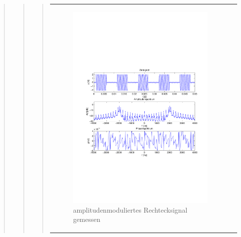 \begin{quote}
\begin{quote}
\begin{quote}
\begin{center}
\begin{tabular}{ll}
\begin{minipage}{0.6\textwidth}
                    \end{minipage}
                    \begin{minipage}{0.6\textwidth}
    
                         \begin{figure}[H]
                            \label{fig:}
                            \includegraphics[scale=0.4, trim = 2cm 6.5cm 1.5cm
                            8.5cm, clip]{./Bilder/Rechteckmodgemessen} %
                            \caption{amplitudenmoduliertes Rechtecksignal gemessen}
                        \end{figure}
                   \vspace{-1.5em}
    
                    \end{minipage}
    

\end{tabular}
\end{center}
\end{quote}
\end{quote}
\end{quote}
